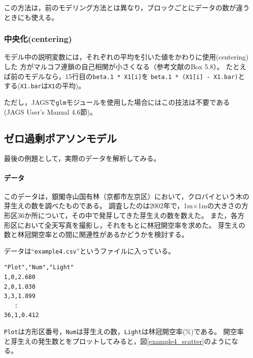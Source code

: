 \documentclass[11pt,uplatex]{jsarticle}
\begin{document}
この方法は，前のモデリング方法とは異なり，ブロックごとにデータの数が違うときにも使える。

\subsubsection*{中央化(centering)}

モデル中の説明変数には，それぞれの平均を引いた値をかわりに使用(centering)した
方がマルコフ連鎖の自己相関が小さくなる（参考文献\cite{McCarthy}のBox 5.8）。
たとえば前のモデルなら，15行目の\texttt{beta.1 * X1[i]}を
\texttt{beta.1 * (X1[i] - X1.bar)}とする(\texttt{X1.bar}は\texttt{X1}の平均)。

ただし，\textsf{JAGS}で\texttt{glm}モジュールを使用した場合にはこの技法は不要である
(JAGS User's Manual\cite{JAGS} 4.6節)。


\subsection{ゼロ過剰ポアソンモデル}
\label{path}

最後の例題として，実際のデータを解析してみる。

\paragraph{データ}
このデータは，銀閣寺山国有林（京都市左京区）において，クロバイという木の芽生えの数を調べたものである。
調査したのは2002年で，1m×1mの大きさの方形区36か所について，その中で発芽してきた芽生えの数を数えた。
また，各方形区において全天写真を撮影し，それをもとに林冠開空率を求めた。
芽生えの数と林冠開空率との間に関連性があるかどうかを検討する。

データは``\texttt{example4.csv}''というファイルに入っている。
\begin{lstlisting}
"Plot","Num","Light"
1,0,2.680
2,0,1.030
3,3,1.899
   :
36,1,0.412
\end{lstlisting}
\noindent
\texttt{Plot}は方形区番号，\texttt{Num}は芽生えの数，\texttt{Light}は林冠開空率(\%)である。
開空率と芽生えの発生数とをプロットしてみると，図\ref{example4_scatter}のようになる。
\end{document}
